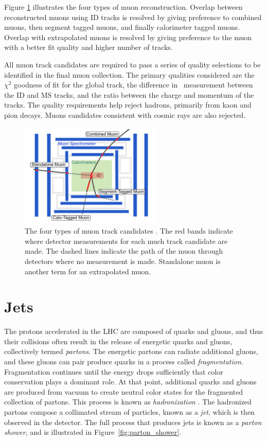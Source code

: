 Figure \ref{fig:muon_tracks} illustrates the four types of muon reconstruction. Overlap between reconstructed muons using ID tracks is resolved by giving preference to combined muons, then segment tagged muons, and finally calorimeter tagged muons. Overlap with extrapolated muons is resolved by giving preference to the muon with a better fit quality and higher number of tracks. \par

All muon track candidates are required to pass a series of quality selections to be identified in the final muon collection. The primary qualities considered are the $\chi^2$ goodness of fit for the global track, the difference in \pt~measurement between the ID and MS tracks, and the ratio between the charge and momentum of the tracks. The quality requirements help reject hadrons, primarily from kaon and pion decays. Muons candidates consistent with cosmic rays are also rejected.

\begin{figure}[h]
        \centering
	\includegraphics[width=0.6\textwidth]{figures/ch5/muon_tracks}
	\caption{The four types of muon track candidates \cite{muon_id}. The red bands indicate where detector measurements for each much track candidate are made. The dashed lines indicate the path of the muon through detectors where no measurement is made. Standalone muon is another term for an extrapolated muon.}
	\label{fig:muon_tracks}
\end{figure}

\section{Jets}
The protons accelerated in the LHC are composed of quarks and gluons, and thus their collisions often result in the release of energetic quarks and gluons, collectively termed \textit{partons}. The energetic partons can radiate additional gluons, and these gluons can pair produce quarks in a process called \textit{fragmentation}. Fragmentation continues until the energy drops sufficiently that color conservation plays a dominant role. At that point, additional quarks and gluons are produced from vacuum to create neutral color states for the fragmented collection of partons. This process is known as \textit{hadronization} \cite{fragmentation}. The hadronized partons compose a collimated stream of particles, known as a \textit{jet}, which is then observed in the detector. The full process that produces jets is known as a \textit{parton shower}, and is illustrated in Figure~\ref{fig:parton_shower}. 

